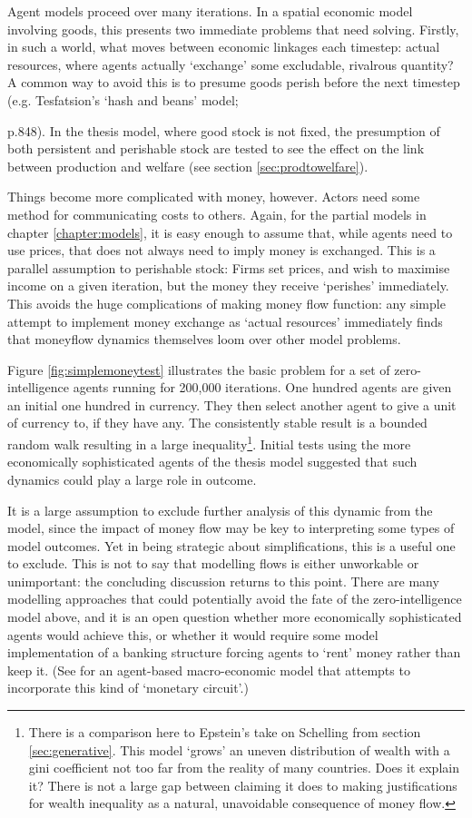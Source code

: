 Agent models proceed over many iterations. In a spatial economic model involving goods, this presents two immediate problems that need solving. Firstly, in such a world, what moves between economic linkages each timestep: actual resources, where agents actually `exchange' some excludable, rivalrous quantity? A common way to avoid this is to presume goods perish before the next timestep (e.g. Tesfatsion's `hash and beans' model; {\citealt{tesfatsion_agent-based_2006} p.848). In the thesis model, where good stock is not fixed, the presumption of both persistent and perishable stock are tested to see the effect on the link between production and welfare (see section \ref{sec:prodtowelfare}).

Things become more complicated with money, however. Actors need some method for communicating costs to others. Again, for the partial models in chapter \ref{chapter:models}, it is easy enough to assume that, while agents need to use prices, that does not always need to imply money is exchanged. This is a parallel assumption to perishable stock: Firms set prices, and wish to maximise income on a given iteration, but the money they receive `perishes' immediately. This avoids the huge complications of making money flow function: any simple attempt to implement money exchange as `actual resources' immediately finds that moneyflow dynamics themselves loom over other model problems. 

Figure \ref{fig:simplemoneytest} illustrates the basic problem for a set of zero-intelligence agents running for 200,000 iterations. One hundred agents are given an initial one hundred in currency. They then select another agent to give a unit of currency to, if they have any. The consistently stable result is a bounded random walk resulting in a large inequality\footnote{There is a comparison here to Epstein's take on Schelling from section \ref{sec:generative}. This model `grows' an uneven distribution of wealth with a gini coefficient not too far from the reality of many countries. Does it explain it? There is not a large gap between claiming it does to making justifications for wealth inequality as a natural, unavoidable consequence of money flow.}. Initial tests using the more economically sophisticated agents of the thesis model suggested that such dynamics could play a large role in outcome. 

It is a large assumption to exclude further analysis of this dynamic from the model,  since the impact of money flow may be key to interpreting some types of model outcomes. Yet in being strategic about simplifications, this is a useful one to exclude. This is not to say that modelling flows is either unworkable or unimportant: the concluding discussion returns to this point. There are many modelling approaches that could potentially avoid the fate of the zero-intelligence model above, and it is an open question whether more economically sophisticated agents would achieve this, or whether it would require some model implementation of a banking structure forcing agents to `rent' money rather than keep it. (See \citealt{oeffner_agent-based_2008} for an agent-based macro-economic model that attempts to incorporate this kind of `monetary circuit'.)

}
